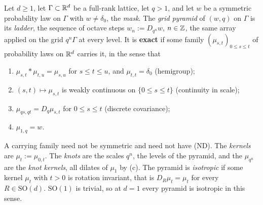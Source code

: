 \begin{definition}
\label{def:exact-grid-pyramid}
\leanok
Let $d \ge 1$, let $\Gamma \subset \mathbb{R}^d$ be a full-rank lattice, let $q > 1$, and let $w$ be a
symmetric probability law on $\Gamma$ with $w \ne \delta_0$, the \emph{mask}. The
\emph{grid pyramid} of $(w, q)$ on $\Gamma$ is its \emph{ladder}, the sequence of octave steps
$w_n := D_{q^n}w$, $n \in \mathbb{Z}$, the same array applied on the grid $q^n\Gamma$ at every level. It is
\textbf{exact} if some family $(\mu_{s,t})_{0 \le s \le t}$ of probability laws on $\mathbb{R}^d$ carries
it, in the sense that
\begin{enumerate}
\item[(a)] $\mu_{s,t} * \mu_{t,u} = \mu_{s,u}$ for $s \le t \le u$, and $\mu_{t,t} = \delta_0$
(hemigroup);
\item[(b)] $(s,t) \mapsto \mu_{s,t}$ is weakly continuous on $\{0 \le s \le t\}$ (continuity in
scale);
\item[(c)] $\mu_{qs,qt} = D_q\mu_{s,t}$ for $0 \le s \le t$ (discrete covariance);
\item[(d)] $\mu_{1,q} = w$.
\end{enumerate}
A carrying family need not be symmetric and need not have (ND). The \emph{kernels} are $\mu_t := \mu_{0,t}$. The \emph{knots} are the scales $q^n$, the levels of
the pyramid, and the $\mu_{q^n}$ are the \emph{knot kernels}, all dilates of $\mu_1$ by (c). The
pyramid is \emph{isotropic} if some kernel $\mu_t$ with $t > 0$ is rotation invariant, that is
$D_R\mu_t = \mu_t$ for every $R \in \mathrm{SO}(d)$. $\mathrm{SO}(1)$ is trivial, so at $d = 1$ every pyramid
is isotropic in this sense.

\end{definition}
